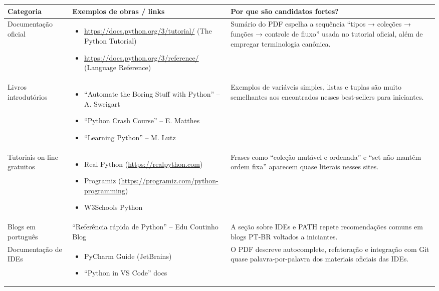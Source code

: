 \begin{table}[htbp]
\centering
\renewcommand{\arraystretch}{1.2}
\begin{tabular}{>{\raggedright}p{3.0cm} >{\raggedright}p{5.5cm} >{\raggedright\arraybackslash}p{6.5cm}}
\toprule
\textbf{Categoria} & \textbf{Exemplos de obras / links} & \textbf{Por que são candidatos fortes?} \\ \midrule
Documentação oficial &
\begin{itemize}
  \item \url{https://docs.python.org/3/tutorial/} (The Python Tutorial)
  \item \url{https://docs.python.org/3/reference/} (Language Reference)
\end{itemize} &
Sumário do PDF espelha a sequência “tipos → coleções → funções → controle de fluxo” usada no tutorial oficial, além de empregar terminologia canônica. \\ \midrule

Livros introdutórios &
\begin{itemize}
  \item “Automate the Boring Stuff with Python” – A. Sweigart
  \item “Python Crash Course” – E. Matthes
  \item “Learning Python” – M. Lutz
\end{itemize} &
Exemplos de variáveis simples, listas e tuplas são muito semelhantes aos encontrados nesses best-sellers para iniciantes. \\ \midrule

Tutoriais on-line gratuitos &
\begin{itemize}
  \item Real Python (\url{https://realpython.com})
  \item Programiz (\url{https://programiz.com/python-programming})
  \item W3Schools Python
\end{itemize} &
Frases como “coleção mutável e ordenada” e “set não mantém ordem fixa” aparecem quase literais nesses sites. \\ \midrule

Blogs em português &
“Referência rápida de Python” – Edu Coutinho Blog &
A seção sobre IDEs e PATH repete recomendações comuns em blogs PT-BR voltados a iniciantes. \\ \midrule

Documentação de IDEs &
\begin{itemize}
  \item PyCharm Guide (JetBrains)
  \item “Python in VS Code” docs
\end{itemize} &
O PDF descreve autocomplete, refatoração e integração com Git quase palavra-por-palavra dos materiais oficiais das IDEs. \\ \midrule


\end{tabular}
\end{table}
